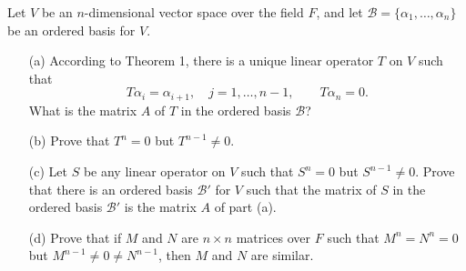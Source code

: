 \begin{problem}
    Let \(V\) be an \(n\)-dimensional vector space over the field \(F\), and let \(\mathcal{B}=\{\alpha_1,\dots,\alpha_n\}\) be an ordered basis for \(V\).
    \begin{itemize} 
        \item [(a)] According to Theorem 1, there is a unique linear operator \(T\) on \(V\) such that
        \[
            T\alpha_i=\alpha_{i+1},\quad j=1,\dots,n-1,\qquad T\alpha_n=0.
        \]
        What is the matrix \(A\) of \(T\) in the ordered basis \(\mathcal{B}\)?
        
        \item [(b)] Prove that \(T^n=0\) but \(T^{n-1}\neq 0\).
        
        \item [(c)] Let \(S\) be any linear operator on \(V\) such that \(S^n=0\) but \(S^{n-1}\neq 0\).  Prove that there is an ordered basis \(\mathcal{B}'\) for \(V\) such that the matrix of \(S\) in the ordered basis \(\mathcal{B}'\) is the matrix \(A\) of part (a).
        
        \item [(d)] Prove that if \(M\) and \(N\) are \(n\times n\) matrices over \(F\) such that \(M^n=N^n=0\) but \(M^{n-1}\neq 0\neq N^{n-1}\), then \(M\) and \(N\) are similar.
    \end{itemize}
\end{problem}
